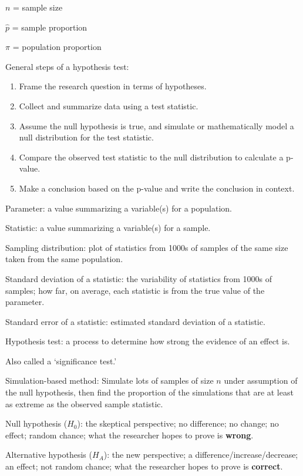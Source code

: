 \documentclass[
]{report}
\newcommand{\rgi}{\hspace{24pt}}  %
\begin{document}
\(n\) = sample size

\(\hat{p}\) = sample proportion

\(\pi\) = population proportion

General steps of a hypothesis test:

\begin{enumerate}
\def\labelenumi{\arabic{enumi}.}
\item
  Frame the research question in terms of hypotheses.
\item
  Collect and summarize data using a test statistic.
\item
  Assume the null hypothesis is true, and simulate or mathematically model a null distribution for the test statistic.
\item
  Compare the observed test statistic to the null distribution to calculate a p-value.
\item
  Make a conclusion based on the p-value and write the conclusion in context.
\end{enumerate}

Parameter: a value summarizing a variable(s) for a population.

Statistic: a value summarizing a variable(s) for a sample.

Sampling distribution: plot of statistics from 1000s of samples of the same size taken from the same population.

Standard deviation of a statistic: the variability of statistics from 1000s of samples; how far, on average, each statistic is from the true value of the parameter.

Standard error of a statistic: estimated standard deviation of a statistic.

Hypothesis test: a process to determine how strong the evidence of an effect is.

\rgi Also called a `significance test.'

Simulation-based method: Simulate lots of samples of size \(n\) under assumption of the null hypothesis, then find the proportion of the simulations that are at least as extreme as the observed sample statistic.

Null hypothesis (\(H_0\)): the skeptical perspective; no difference; no change; no effect; random chance; what the researcher hopes to prove is \textbf{wrong}.

Alternative hypothesis (\(H_A\)): the new perspective; a difference/increase/decrease; an effect; not random chance; what the researcher hopes to prove is \textbf{correct}.
\end{document}
